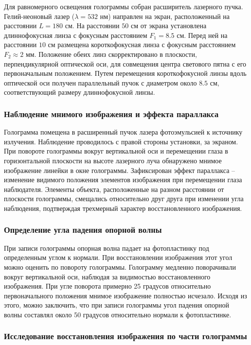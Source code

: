 Для равномерного освещения голограммы собран расширитель лазерного пучка. Гелий-неоновый лазер ($\lambda = 532$ нм) направлен на экран, расположенный на расстоянии $L = 180$ см. На расстоянии $50$ см от экрана установлена длиннофокусная линза с фокусным расстоянием $F_1 = 8.5$ см. Перед ней на расстоянии $10$ см размещена короткофокусная линза с фокусным расстоянием $F_2 \approx 2$ мм. Положение обеих линз скорректировано в плоскости, перпендикулярной оптической оси, для совмещения центра светового пятна с его первоначальным положением. Путем перемещения короткофокусной линзы вдоль оптической оси получен параллельный пучок с диаметром около $8.5$ см, соответствующий размеру длиннофокусной линзы.

\subsubsection{Наблюдение мнимого изображения и эффекта параллакса}

Голограмма помещена в расширенный пучок лазера фотоэмульсией к источнику излучения. Наблюдение проводилось с правой стороны установки, за экраном. При повороте голограммы вокруг вертикальной оси и перемещении глаза в горизонтальной плоскости на высоте лазерного луча обнаружено мнимое изображение линейки в окне голограммы. Зафиксирован эффект параллакса – изменение видимого положения элементов изображения при перемещении глаза наблюдателя. Элементы объекта, расположенные на разном расстоянии от плоскости голограммы, смещались относительно друг друга при изменении угла наблюдения, подтверждая трехмерный характер восстановленного изображения.

\subsubsection{Определение угла падения опорной волны}

При записи голограммы опорная волна падает на фотопластинку под определенным углом к нормали. При восстановлении изображения этот угол можно оценить по повороту голограммы. Голограмму медленно поворачивали вокруг вертикальной оси, наблюдая за видимостью восстановленного изображения. При угле поворота примерно 25 градусов относительно первоначального положения мнимое изображение полностью исчезало. Исходя из этого, можно заключить, что при записи голограммы угол падения опорной волны составлял около 50 градусов относительно нормали к фотопластинке.

\subsubsection{Исследование восстановления изображения по части голограммы}

